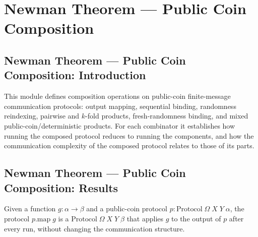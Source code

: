 \section{Newman Theorem --- Public Coin Composition}
\subsection*{Newman Theorem --- Public Coin Composition: Introduction}

This module defines composition operations on public-coin finite-message communication
protocols: output mapping, sequential binding, randomness reindexing, pairwise and
$k$-fold products, fresh-randomness binding, and mixed public-coin/deterministic products.
For each combinator it establishes how running the composed protocol reduces to running the
components, and how the communication complexity of the composed protocol relates to those
of its parts.

\subsection*{Newman Theorem --- Public Coin Composition: Results}

\begin{definition}
\label{CommunicationComplexity.PublicCoin.FiniteMessage.Protocol.map}
\leanok
{}
Given a function $g : \alpha \to \beta$ and a public-coin protocol
$p : \mathrm{Protocol}\;\Omega\;X\;Y\;\alpha$, the protocol $p.\mathrm{map}\;g$
is a $\mathrm{Protocol}\;\Omega\;X\;Y\;\beta$ that applies $g$ to the output of $p$
after every run, without changing the communication structure.
\end{definition}

